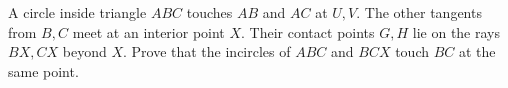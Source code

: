 A circle inside triangle $ ABC $ touches $ AB $ and $ AC $ at $ U,V $. The other tangents from $ B,C $ meet at an interior point $ X $. Their contact points $ G,H $ lie on the rays $ BX,CX $ beyond $ X $. Prove that the incircles of $ ABC $ and $ BCX $ touch $ BC $ at the same point.
